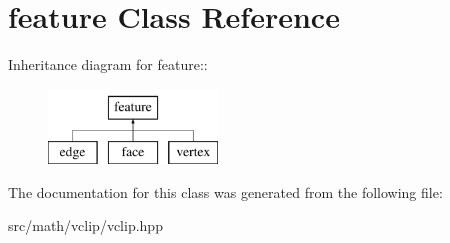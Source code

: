 \hypertarget{classfeature}{
\section{feature Class Reference}
\label{classfeature}
}
Inheritance diagram for feature::\begin{figure}[H]
\begin{center}
\leavevmode
\includegraphics[height=2cm]{classfeature}
\end{center}
\end{figure}


The documentation for this class was generated from the following file:\begin{DoxyCompactItemize}
\item 
src/math/vclip/vclip.hpp\end{DoxyCompactItemize}
